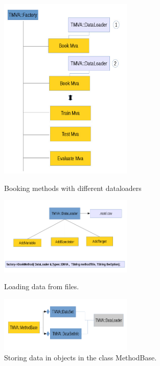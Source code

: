 \documentclass[a4paper]{jpconf}
\begin{document}
\begin{figure}[h]
\begin{minipage}{15pc}
\includegraphics[width=15pc]{img/dl1.jpg}
\caption{\label{dl1}Booking methods with different dataloaders}
\end{minipage}\hspace{2pc}%
\begin{minipage}{15pc}
\includegraphics[width=15pc]{img/dl2.jpg}
\caption{\label{dl2}Loading data from files.}
\includegraphics[width=15pc]{img/dl3.jpg}
\caption{\label{dl3}Storing data in objects in the class MethodBase.}
\end{minipage} 
\end{figure}
\end{document}
